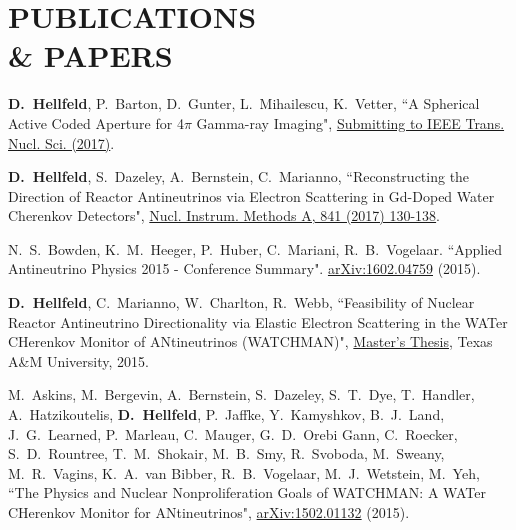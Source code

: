 \documentclass[margin, 10pt]{style/res} %
\begin{document}
\begin{resume}
\begin{thebibliography}{3}
 \end{thebibliography}





\section{\small{PUBLICATIONS \\\& PAPERS}}

\begin{thebibliography}{3}
 \raggedright
\vspace{10pt}

 \textbf{D.~Hellfeld}, P.~Barton, D.~Gunter, L.~Mihailescu, K.~Vetter, ``A Spherical Active Coded Aperture for 4$\pi$ Gamma-ray Imaging", \href{http://www.google.com}{Submitting to IEEE Trans. Nucl. Sci. (2017)}.
 
 \textbf{D.~Hellfeld}, S.~Dazeley, A.~Bernstein, C.~Marianno, ``Reconstructing the Direction of Reactor Antineutrinos via Electron Scattering in Gd-Doped Water Cherenkov Detectors", \href{http://www.sciencedirect.com/science/article/pii/S0168900216310555}{Nucl. Instrum. Methods A, 841 (2017) 130-138}.

 N.~S.~Bowden, K.~M.~Heeger, P.~Huber, C.~Mariani, R.~B.~Vogelaar. ``Applied Antineutrino Physics 2015 - Conference Summary". \href{http://arxiv.org/abs/1602.04759}{arXiv:1602.04759} (2015).

 \textbf{D.~Hellfeld}, C.~Marianno, W.~Charlton, R.~Webb, ``Feasibility of Nuclear Reactor Antineutrino Directionality via Elastic Electron Scattering in the WATer CHerenkov Monitor of ANtineutrinos (WATCHMAN)", \href{http://hdl.handle.net/1969.1/155140}{Master's Thesis}, Texas A\&M University, 2015.

 M.~Askins, M.~Bergevin, A.~Bernstein, S.~Dazeley, S.~T.~Dye, T.~Handler, A.~Hatzikoutelis, \textbf{D.~Hellfeld}, P.~Jaffke, Y.~Kamyshkov, B.~J.~Land, J.~G.~Learned, P.~Marleau, C.~Mauger, G.~D.~Orebi Gann, C.~Roecker, S.~D.~Rountree, T.~M.~Shokair, M.~B.~Smy, R.~Svoboda, M.~Sweany, M.~R.~Vagins, K.~A.~van Bibber, R.~B.~Vogelaar, M.~J.~Wetstein, M.~Yeh, ``The Physics and Nuclear Nonproliferation Goals of WATCHMAN: A WATer CHerenkov Monitor for ANtineutrinos", \href{http://arxiv.org/pdf/1502.01132.pdf}{arXiv:1502.01132} (2015).


\end{thebibliography}
\end{resume}
\end{document}
